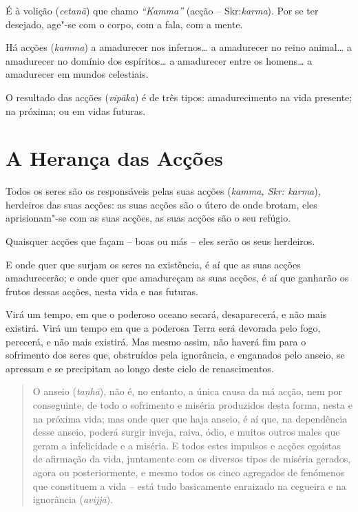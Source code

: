 É à volição (\emph{cetanā}) que chamo \emph{“Kamma”} (acção -- Skr:\emph{karma}). Por se ter
desejado, age"-se com o corpo, com a fala, com a mente.

Há acções (\emph{kamma}) a amadurecer nos infernos\ldots{} a amadurecer no reino
animal\ldots{} a amadurecer no domínio dos espíritos\ldots{} a amadurecer entre
os homens\ldots{} a amadurecer em mundos celestiais.

O resultado das acções (\emph{vipāka}) é de três tipos: amadurecimento na vida
presente; na próxima; ou em vidas futuras.


\section{A Herança das Acções}

Todos os seres são os responsáveis pelas suas acções (\emph{kamma, Skr: karma}),
herdeiros das suas acções: as suas acções são o útero de onde brotam, eles
aprisionam"-se com as suas acções, as suas acções são o seu refúgio.

Quaisquer acções que façam -- boas ou más -- eles serão os seus herdeiros.


E onde quer que surjam os seres na existência, é aí que as suas acções
amadurecerão; e onde quer que amadureçam as suas acções, é aí que ganharão os
frutos dessas acções, nesta vida e nas futuras.


Virá um tempo, em que o poderoso oceano secará, desaparecerá, e não mais
existirá. Virá um tempo em que a poderosa Terra será devorada pelo fogo,
perecerá, e não mais existirá. Mas mesmo assim, não haverá fim para o sofrimento
dos seres que, obstruídos pela ignorância, e enganados pelo anseio, se apressam
e se precipitam ao longo deste ciclo de renascimentos.


\clearpage

\begin{quote}
  O anseio (\emph{ta\d{n}hā}), não é, no entanto, a única causa da má acção, nem por
  conseguinte, de todo o sofrimento e miséria produzidos desta forma, nesta e na
  próxima vida; mas onde quer que haja anseio, é aí que, na dependência desse
  anseio, poderá surgir inveja, raiva, ódio, e muitos outros males que geram a
  infelicidade e a miséria. E todos estes impulsos e acções egoístas de
  afirmação da vida, juntamente com os diversos tipos de miséria gerados, agora
  ou posteriormente, e mesmo todos os cinco agregados de fenómenos que
  constituem a vida -- está tudo basicamente enraizado na cegueira e na
  ignorância (\emph{avijjā}).
\end{quote}

